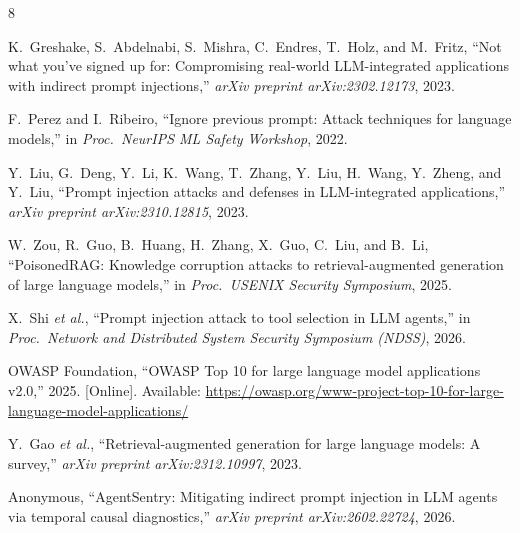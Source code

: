 \documentclass[conference,compsoc]{IEEEtran}
\begin{document}
\begin{thebibliography}{8}

K.~Greshake, S.~Abdelnabi, S.~Mishra, C.~Endres, T.~Holz, and
M.~Fritz, ``Not what you've signed up for: Compromising real-world LLM-integrated
applications with indirect prompt injections,'' \emph{arXiv preprint
arXiv:2302.12173}, 2023.

F.~Perez and I.~Ribeiro, ``Ignore previous prompt: Attack techniques for
language models,'' in \emph{Proc.\ NeurIPS ML Safety Workshop}, 2022.

Y.~Liu, G.~Deng, Y.~Li, K.~Wang, T.~Zhang, Y.~Liu, H.~Wang, Y.~Zheng,
and Y.~Liu, ``Prompt injection attacks and defenses in LLM-integrated
applications,'' \emph{arXiv preprint arXiv:2310.12815}, 2023.

W.~Zou, R.~Guo, B.~Huang, H.~Zhang, X.~Guo, C.~Liu, and B.~Li,
``PoisonedRAG: Knowledge corruption attacks to retrieval-augmented generation of
large language models,'' in \emph{Proc.\ USENIX Security Symposium}, 2025.

X.~Shi \emph{et al.}, ``Prompt injection attack to tool selection in LLM
agents,'' in \emph{Proc.\ Network and Distributed System Security Symposium
(NDSS)}, 2026.

{OWASP Foundation}, ``OWASP Top 10 for large language model applications v2.0,''
2025. [Online]. Available: \url{https://owasp.org/www-project-top-10-for-large-language-model-applications/}

Y.~Gao \emph{et al.}, ``Retrieval-augmented generation for large language
models: A survey,'' \emph{arXiv preprint arXiv:2312.10997}, 2023.

Anonymous, ``AgentSentry: Mitigating indirect prompt injection in LLM agents
via temporal causal diagnostics,'' \emph{arXiv preprint arXiv:2602.22724}, 2026.

\end{thebibliography}
\end{document}
